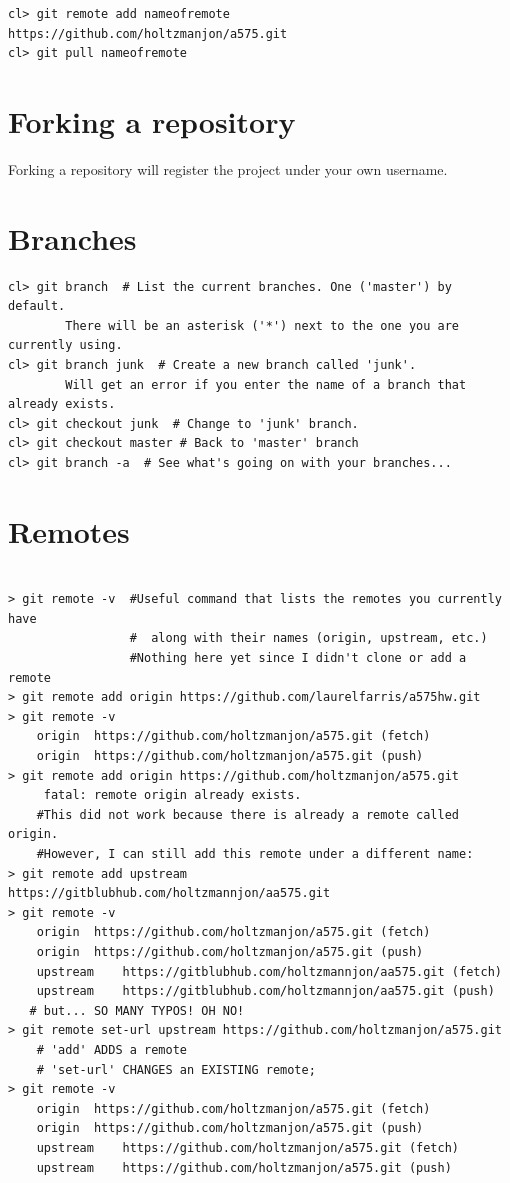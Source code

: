 \documentclass{article}
\begin{document}
\begin{verbatim}
cl> git remote add nameofremote https://github.com/holtzmanjon/a575.git
cl> git pull nameofremote
\end{verbatim}

\section{Forking a repository}
Forking a repository will register the project under your own username.

\section{Branches}
\begin{verbatim}
cl> git branch  # List the current branches. One ('master') by default.
        There will be an asterisk ('*') next to the one you are currently using.
cl> git branch junk  # Create a new branch called 'junk'.
        Will get an error if you enter the name of a branch that already exists.
cl> git checkout junk  # Change to 'junk' branch.
cl> git checkout master # Back to 'master' branch
cl> git branch -a  # See what's going on with your branches...
\end{verbatim}

\section{Remotes}

\begin{verbatim}

> git remote -v  #Useful command that lists the remotes you currently have
                 #  along with their names (origin, upstream, etc.)
                 #Nothing here yet since I didn't clone or add a remote
> git remote add origin https://github.com/laurelfarris/a575hw.git
> git remote -v
	origin	https://github.com/holtzmanjon/a575.git (fetch)
	origin	https://github.com/holtzmanjon/a575.git (push)
> git remote add origin https://github.com/holtzmanjon/a575.git
     fatal: remote origin already exists.
    #This did not work because there is already a remote called origin.
    #However, I can still add this remote under a different name:
> git remote add upstream https://gitblubhub.com/holtzmannjon/aa575.git
> git remote -v
	origin	https://github.com/holtzmanjon/a575.git (fetch)
	origin	https://github.com/holtzmanjon/a575.git (push)
	upstream	https://gitblubhub.com/holtzmannjon/aa575.git (fetch)
	upstream	https://gitblubhub.com/holtzmannjon/aa575.git (push)
   # but... SO MANY TYPOS! OH NO!
> git remote set-url upstream https://github.com/holtzmanjon/a575.git
    # 'add' ADDS a remote
    # 'set-url' CHANGES an EXISTING remote;
> git remote -v
	origin	https://github.com/holtzmanjon/a575.git (fetch)
	origin	https://github.com/holtzmanjon/a575.git (push)
	upstream	https://github.com/holtzmanjon/a575.git (fetch)
	upstream	https://github.com/holtzmanjon/a575.git (push)

\end{verbatim}
\end{document}
